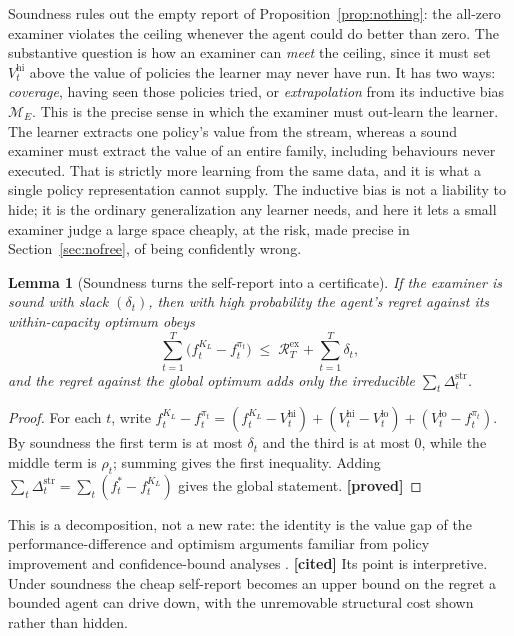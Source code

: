 \documentclass[10pt]{article} %
\theoremstyle{definition}
\theoremstyle{plain}
\newtheorem{lemma}{Lemma}
\newcommand{\ModE}{\mathcal{M}_E}
\newcommand{\Vlow}{V^{\mathrm{lo}}_t}
\newcommand{\Vhi}{V^{\mathrm{hi}}_t}
\newcommand{\Rex}{\mathcal{R}^{\mathrm{ex}}}
\newcommand{\Dstruct}{\Delta^{\mathrm{str}}}
\begin{document}
Soundness rules out the empty report of Proposition~\ref{prop:nothing}: the all-zero examiner violates the ceiling whenever the agent could do better than zero. The substantive question is how an examiner can \emph{meet} the ceiling, since it must set $\Vhi$ above the value of policies the learner may never have run. It has two ways: \emph{coverage}, having seen those policies tried, or \emph{extrapolation} from its inductive bias $\ModE$. This is the precise sense in which the examiner must out-learn the learner. The learner extracts one policy's value from the stream, whereas a sound examiner must extract the value of an entire family, including behaviours never executed. That is strictly more learning from the same data, and it is what a single policy representation cannot supply. The inductive bias is not a liability to hide; it is the ordinary generalization any learner needs, and here it lets a small examiner judge a large space cheaply, at the risk, made precise in Section~\ref{sec:nofree}, of being confidently wrong.

\begin{lemma}[Soundness turns the self-report into a certificate]
\label{lem:bridge}
If the examiner is sound with slack $(\delta_t)$, then with high probability the agent's regret against its within-capacity optimum obeys
\[
\sum_{t=1}^T \big(f^{K_L}_t - f^{\pi_t}_t\big) \;\le\; \Rex_T + \sum_{t=1}^T \delta_t,
\]
and the regret against the global optimum adds only the irreducible $\sum_t \Dstruct_t$.
\end{lemma}

\begin{proof}
For each $t$, write $f^{K_L}_t - f^{\pi_t}_t = (f^{K_L}_t - \Vhi) + (\Vhi - \Vlow) + (\Vlow - f^{\pi_t}_t)$. By soundness the first term is at most $\delta_t$ and the third is at most $0$, while the middle term is $\rho_t$; summing gives the first inequality. Adding $\sum_t \Dstruct_t = \sum_t(f^{*}_t - f^{K_L}_t)$ gives the global statement. \textbf{[proved]}
\end{proof}

This is a decomposition, not a new rate: the identity is the value gap of the performance-difference and optimism arguments familiar from policy improvement and confidence-bound analyses \citep{kakade2002cpi,jaksch2010ucrl2}. \textbf{[cited]} Its point is interpretive. Under soundness the cheap self-report becomes an upper bound on the regret a bounded agent can drive down, with the unremovable structural cost shown rather than hidden.
\end{document}
